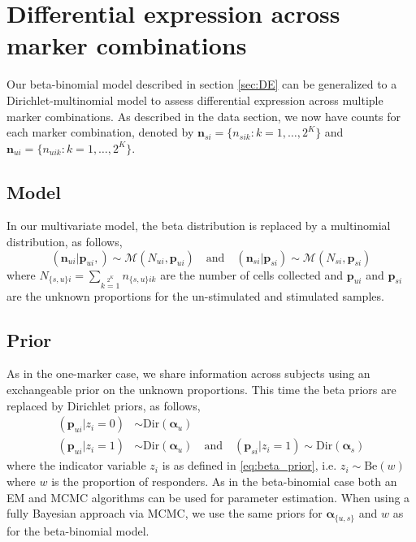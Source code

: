 \documentclass[11pt]{article}
\begin{document}
\section{Differential expression across marker combinations}
Our beta-binomial model described in section \ref{sec:DE} can be generalized to a Dirichlet-multinomial model to assess differential expression across multiple marker combinations. As described in the data section, we now have counts for each marker combination, denoted by  $\mathbf{n}_{si}=\{n_{sik}: k=1,\dots,2^K\}$ and $\mathbf{n}_{ui}=\{n_{uik}: k=1,\dots,2^K\}$. 
\subsection{Model}

In our multivariate model, the beta distribution is replaced by a multinomial distribution, as follows,
\begin{equation}
 (\mathbf{n}_{ui}|\mathbf{p}_{ui},) \sim \mathcal{M}(N_{ui},\mathbf{p}_{ui})\quad\text{and}\quad (\mathbf{n}_{si}|\mathbf{p}_{si}) \sim \mathcal{M}(N_{si},\mathbf{p}_{si})\label{eq:mult_likeliehood}
 \end{equation}
where $N_{\{s,u\}i}=\sum\limits_{k=1}\limits^{2^K} n_{\{s,u\}ik}$ are the number of cells collected and $\mathbf{p}_{ui}$ and $\mathbf{p}_{si}$ are the unknown proportions for the un-stimulated and stimulated samples.

\subsection{Prior}
As in the one-marker case, we share information across subjects using an exchangeable prior on the unknown proportions. This time the beta priors are replaced by Dirichlet priors, as follows,
\begin{align}
(\mathbf{p}_{ui}|z_i=0) &\sim \mathrm{Dir}(\boldsymbol{\alpha}_u)\\\nonumber
(\mathbf{p}_{ui}|z_i=1) &\sim \mathrm{Dir}(\boldsymbol{\alpha}_u) \quad \text{and}\quad (\mathbf{p}_{si}|z_i=1) \sim \mathrm{Dir}(\boldsymbol{\alpha}_s)\label{eq:dir_prior}
\end{align}
where the indicator variable $z_i$ is as defined in \eqref{eq:beta_prior}, i.e. $z_i\sim\mathrm{Be}(w)$ where $w$ is the proportion of responders. As in the beta-binomial case both an EM and MCMC algorithms can be used for parameter estimation. When using a fully Bayesian approach via MCMC, we use the same priors for $\boldsymbol{\alpha}_{\{u,s\}}$ and $w$ as for the beta-binomial model. 
\end{document}
